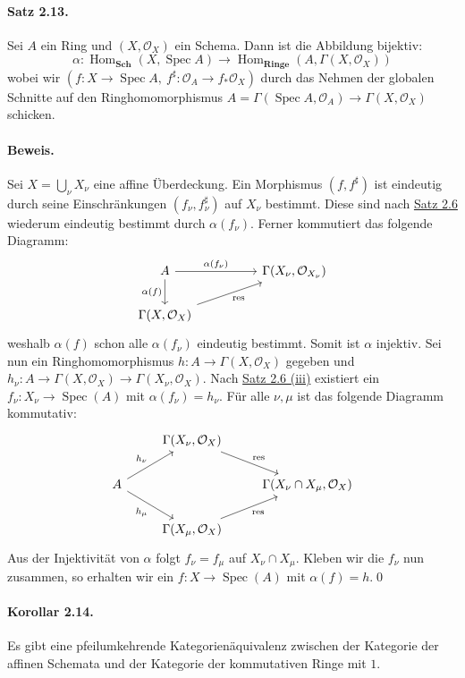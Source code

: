 \paragraph{Satz 2.13.}\label{2.13} Sei $A$ ein Ring und $(X,\mathcal{O}_X)$ ein Schema. Dann ist die Abbildung bijektiv:
\[\alpha:\operatorname{Hom}_\mathbf{Sch}(X,\operatorname{Spec}A)\to \operatorname{Hom}_\textbf{Ringe}(A,\Gamma(X,\mathcal{O}_X)) \]
wobei wir $(f:X\to\operatorname{Spec}A ,\ f^\sharp:\mathcal{O}_A\to f_\ast\mathcal{O}_X)$ durch das Nehmen der globalen Schnitte auf den Ringhomomorphismus $A=\Gamma(\operatorname{Spec}A,\mathcal{O}_A)\to\Gamma(X,\mathcal{O}_X)$ schicken.

\paragraph{Beweis.} Sei $X=\bigcup_\nu X_\nu$ eine affine Überdeckung. Ein Morphismus $(f,f^\sharp)$ ist eindeutig durch seine Einschränkungen $(f_\nu,f_\nu^\sharp)$ auf $X_\nu$ bestimmt. Diese sind nach \hyperref[2.6]{Satz 2.6} wiederum eindeutig bestimmt durch $\alpha(f_\nu)$. Ferner kommutiert das folgende Diagramm:
\[\begin{tikzcd}
A\ar[d, "\alpha(f)"']\ar[rr, "\alpha(f_\nu)"] && \Gamma(X_\nu,\mathcal{O}_{X_\nu})\\
\Gamma(X,\mathcal{O}_X)\ar[rru, "\operatorname{res}"']
\end{tikzcd} \]
weshalb $\alpha(f)$ schon alle $\alpha(f_\nu)$ eindeutig bestimmt. Somit ist $\alpha$ injektiv. Sei nun ein Ringhomomorphismus $h:A\to\Gamma(X,\mathcal{O}_X)$ gegeben und $h_\nu:A\to\Gamma(X,\mathcal{O}_X)\to\Gamma(X_\nu,\mathcal{O}_X)$. Nach \hyperref[2.6]{Satz 2.6 (iii)} existiert ein $f_\nu:X_\nu\to\operatorname{Spec}(A)$ mit $\alpha(f_\nu)=h_\nu$. Für alle $\nu,\mu$ ist das folgende Diagramm kommutativ:
\[\begin{tikzcd}
& \Gamma(X_\nu,\mathcal{O}_X)\ar[dr, "\operatorname{res}"] &\\
A\ar[ur, "h_\nu"] \ar[dr, "h_\mu"'] & & \Gamma(X_\nu\cap X_\mu,\mathcal{O}_X)\\
& \Gamma(X_\mu,\mathcal{O}_X)\ar[ur, "\operatorname{res}"'] &
\end{tikzcd} \]
Aus der Injektivität von $\alpha$ folgt $f_\nu=f_\mu$ auf $X_\nu\cap X_\mu$. Kleben wir die $f_\nu$ nun zusammen, so erhalten wir ein $f:X\to\operatorname{Spec}(A)$ mit $\alpha(f)=h$.\qed

\paragraph{Korollar 2.14.}\label{2.14} Es gibt eine pfeilumkehrende Kategorienäquivalenz zwischen der Kategorie der affinen Schemata und der Kategorie der kommutativen Ringe mit $1$.

